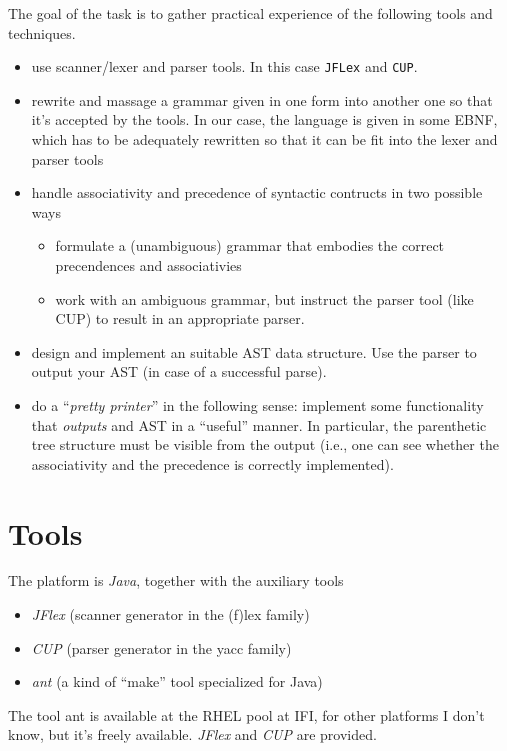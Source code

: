 \documentclass[10pt,freeform]{handout}[2014/08/13]
\begin{document}
The goal of the task is to gather practical experience of the following
tools and techniques.
\begin{itemize}
\item use scanner/lexer and parser tools. In this case \texttt{JFLex} and
  \texttt{CUP}.
\item rewrite and massage a grammar given in one form into another one so
  that it's accepted by the tools. In our case, the language is given in
  some EBNF, which has to be adequately rewritten so that it can be fit
  into the lexer and parser tools
\item handle associativity and precedence of syntactic contructs in two
  possible ways
  \begin{itemize}
  \item formulate a (unambiguous) grammar that embodies the correct
    precendences and associativies
  \item work with an ambiguous grammar, but instruct the parser tool (like
    CUP) to result in an appropriate parser.
  \end{itemize}
\item design and implement an suitable AST data structure.  Use the parser
  to output your AST (in case of a successful parse).
\item do a ``\emph{pretty printer}'' in the following sense: implement some
  functionality that \emph{outputs} and AST in a ``useful'' manner. In
  particular, the parenthetic tree structure must be visible from the
  output (i.e., one can see whether the associativity and the precedence is
  correctly implemented). 
\end{itemize}


\section{Tools}

The platform is \emph{Java}, together with the auxiliary tools

\begin{itemize}
\item \textsl{JFlex} (scanner generator in the (f)lex family)
\item \textsl{CUP} (parser generator in the yacc family)
\item \textsl{ant} (a kind of ``make'' tool specialized for Java)
\end{itemize}


The tool ant is available at the RHEL pool at IFI, for other platforms I
don't know, but it's freely available. \textsl{JFlex} and \textsl{CUP} are
provided.
\end{document}
